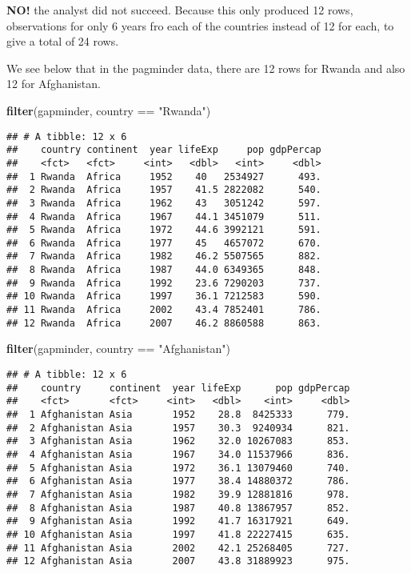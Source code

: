 \documentclass[]{article}
\newenvironment{Shaded}{\begin{snugshade}}{\end{snugshade}}
\newcommand{\KeywordTok}[1]{\textcolor[rgb]{0.13,0.29,0.53}{\textbf{{#1}}}}
\newcommand{\StringTok}[1]{\textcolor[rgb]{0.31,0.60,0.02}{{#1}}}
\newcommand{\NormalTok}[1]{{#1}}
\begin{document}
\textbf{NO!} the analyst did not succeed. Because this only produced 12
rows, observations for only 6 years fro each of the countries instead of
12 for each, to give a total of 24 rows.

We see below that in the pagminder data, there are 12 rows for Rwanda
and also 12 for Afghanistan.

\begin{Shaded}
\begin{Highlighting}[]
 \KeywordTok{filter}\NormalTok{(gapminder, country ==}\StringTok{ "Rwanda"}\NormalTok{)}
\end{Highlighting}
\end{Shaded}

\begin{verbatim}
## # A tibble: 12 x 6
##    country continent  year lifeExp     pop gdpPercap
##    <fct>   <fct>     <int>   <dbl>   <int>     <dbl>
##  1 Rwanda  Africa     1952    40   2534927      493.
##  2 Rwanda  Africa     1957    41.5 2822082      540.
##  3 Rwanda  Africa     1962    43   3051242      597.
##  4 Rwanda  Africa     1967    44.1 3451079      511.
##  5 Rwanda  Africa     1972    44.6 3992121      591.
##  6 Rwanda  Africa     1977    45   4657072      670.
##  7 Rwanda  Africa     1982    46.2 5507565      882.
##  8 Rwanda  Africa     1987    44.0 6349365      848.
##  9 Rwanda  Africa     1992    23.6 7290203      737.
## 10 Rwanda  Africa     1997    36.1 7212583      590.
## 11 Rwanda  Africa     2002    43.4 7852401      786.
## 12 Rwanda  Africa     2007    46.2 8860588      863.
\end{verbatim}

\begin{Shaded}
\begin{Highlighting}[]
 \KeywordTok{filter}\NormalTok{(gapminder, country ==}\StringTok{ "Afghanistan"}\NormalTok{)}
\end{Highlighting}
\end{Shaded}

\begin{verbatim}
## # A tibble: 12 x 6
##    country     continent  year lifeExp      pop gdpPercap
##    <fct>       <fct>     <int>   <dbl>    <int>     <dbl>
##  1 Afghanistan Asia       1952    28.8  8425333      779.
##  2 Afghanistan Asia       1957    30.3  9240934      821.
##  3 Afghanistan Asia       1962    32.0 10267083      853.
##  4 Afghanistan Asia       1967    34.0 11537966      836.
##  5 Afghanistan Asia       1972    36.1 13079460      740.
##  6 Afghanistan Asia       1977    38.4 14880372      786.
##  7 Afghanistan Asia       1982    39.9 12881816      978.
##  8 Afghanistan Asia       1987    40.8 13867957      852.
##  9 Afghanistan Asia       1992    41.7 16317921      649.
## 10 Afghanistan Asia       1997    41.8 22227415      635.
## 11 Afghanistan Asia       2002    42.1 25268405      727.
## 12 Afghanistan Asia       2007    43.8 31889923      975.
\end{verbatim}
\end{document}

